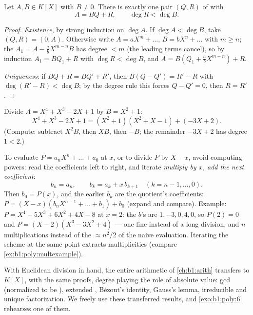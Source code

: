 \begin{theorem}\label{thm:b1:poly:division}
Let $A, B \in K[X]$ with $B \neq 0$. There is exactly one pair $(Q,
R)$ of  with
\[
A = BQ + R, \qquad \deg R < \deg B .
\]
\end{theorem}

\begin{proof}
\emph{Existence}, by strong induction on $\deg A$. If $\deg A < \deg
B$, take $(Q, R) = (0, A)$. Otherwise write $A = a X^m + \dots$, $B =
b X^n + \dots$ with $m \geq n$; the  $A_1 = A - \frac ab
X^{m-n} B$ has degree $< m$ (the leading terms cancel), so by
induction $A_1 = BQ_1 + R$ with $\deg R < \deg B$, and $A = B(Q_1 +
\frac ab X^{m-n}) + R$.

\emph{Uniqueness}: if $BQ + R = BQ' + R'$, then $B(Q - Q') = R' - R$
with $\deg(R' - R) < \deg B$; by the degree rule this forces $Q - Q'
= 0$, then $R = R'$.
\end{proof}

\begin{example}\label{ex:b1:poly:division}
Divide $A = X^4 + X^3 - 2X + 1$ by $B = X^2 + 1$:
\[
X^4 + X^3 - 2X + 1 = (X^2 + 1)(X^2 + X - 1) + (-3X + 2).
\]
(Compute: subtract $X^2 B$, then $X B$, then $-B$; the remainder
$-3X + 2$ has degree $1 < 2$.)
\end{example}

\begin{method}\label{met:b1:poly:horner}
To evaluate $P = a_nX^n + \dots + a_0$ at $x$, or to divide $P$ by
$X - x$, avoid computing powers: read the coefficients left to
right, and iterate \emph{multiply by $x$, add the next
coefficient}:
\[
b_n = a_n, \qquad b_{k} = a_{k} + x\,b_{k+1}
\quad (k = n-1, \dots, 0) .
\]
Then $b_0 = P(x)$, and the earlier $b_k$ are the quotient's
coefficients: $P = (X - x)(b_nX^{n-1} + \dots + b_1) + b_0$
(expand and compare). Example: $P = X^4 - 5X^3 + 6X^2 + 4X - 8$
at $x = 2$: the $b$'s are $1, -3, 0, 4, 0$, so $P(2) = 0$ and $P
= (X-2)(X^3 - 3X^2 + 4)$ --- one line instead of a long
division, and $n$ multiplications instead of the $\approx n^2/2$
of the naive evaluation. Iterating the scheme at the same point
extracts multiplicities (compare
\cref{ex:b1:poly:multexample}).
\end{method}

\begin{remark}[{Arithmetic of $K[X]$}]
With Euclidean division in hand, the entire arithmetic of
\cref{ch:b1:arith} transfers to $K[X]$, with the same proofs, degree
playing the role of absolute value: gcd (normalized to be ),
extended , Bézout's identity, Gauss's lemma,
irreducible  and unique factorization. We freely use these
transferred results, and \cref{exo:b1:poly:6} rehearses one of them.
\end{remark}

